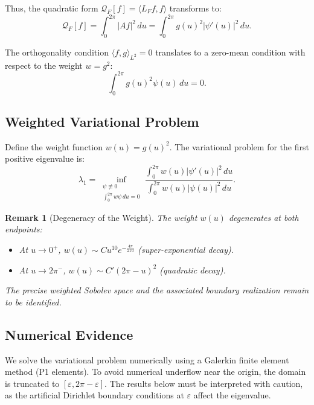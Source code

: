 \documentclass[12pt,a4paper]{article}
\newtheorem{remark}{Remark}
\begin{document}
Thus, the quadratic form \(\mathcal{Q}_F[f] = \langle L_F f, f \rangle\) transforms to:
\begin{equation}\label{eq:Q_frame5}
\mathcal{Q}_F[f] = \int_0^{2\pi} |Af|^2 \, du = \int_0^{2\pi} g(u)^2 |\psi'(u)|^2 \, du.
\end{equation}

The orthogonality condition \(\langle f, g \rangle_{L^2} = 0\) translates to a zero-mean condition with respect to the weight \(w = g^2\):
\begin{equation}\label{eq:orthogonality}
\int_0^{2\pi} g(u)^2 \psi(u) \, du = 0.
\end{equation}

\subsection{Weighted Variational Problem}\label{subsec:5.3}

Define the weight function \(w(u) = g(u)^2\). The variational problem for the first positive eigenvalue is:
\begin{equation}\label{eq:lambda1}
\lambda_1 = \inf_{\substack{\psi \not\equiv 0 \\ \int_0^{2\pi} w\psi \, du = 0}} \frac{\int_0^{2\pi} w(u) |\psi'(u)|^2 \, du}{\int_0^{2\pi} w(u) |\psi(u)|^2 \, du}.
\end{equation}

\begin{remark}[Degeneracy of the Weight]
The weight \(w(u)\) degenerates at both endpoints:
\begin{itemize}
    \item At \(u \to 0^+\), \(w(u) \sim C u^{10} e^{-\frac{4\pi}{21u}}\) (super-exponential decay).
    \item At \(u \to 2\pi^-\), \(w(u) \sim C' (2\pi - u)^2\) (quadratic decay).
\end{itemize}
The precise weighted Sobolev space and the associated boundary realization remain to be identified.
\end{remark}

\subsection{Numerical Evidence}\label{subsec:5.4}

We solve the variational problem numerically using a Galerkin finite element method (P1 elements). To avoid numerical underflow near the origin, the domain is truncated to \([\varepsilon, 2\pi - \varepsilon]\). The results below must be interpreted with caution, as the artificial Dirichlet boundary conditions at \(\varepsilon\) affect the eigenvalue.
\end{document}
